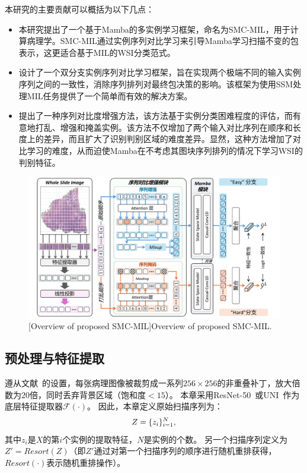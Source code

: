 本研究的主要贡献可以概括为以下几点：
\begin{itemize}
  \item 本研究提出了一个基于Mamba的多实例学习框架，命名为SMC-MIL，用于计算病理学。SMC-MIL通过实例序列对比学习来引导Mamba学习扫描不变的包表示，这更适合基于MIL的WSI分类范式。
  \item 设计了一个双分支实例序列对比学习框架，旨在实现两个极端不同的输入实例序列之间的一致性，消除序列排列对最终包决策的影响。该框架为使用SSM处理MIL任务提供了一个简单而有效的解决方案。
  \item 提出了一种序列对比度增强方法，该方法基于实例分类困难程度的评估，而有意地打乱、增强和掩盖实例。该方法不仅增加了两个输入对比序列在顺序和长度上的差异，而且扩大了识别判别区域的难度差异。显然，这种方法增加了对比学习的难度，从而迫使Mamba在不考虑其图块序列排列的情况下学习WSI的判别特征。 
\end{itemize}

\begin{figure}[h]
  \centering
  \includegraphics[width=1.0\columnwidth]{figures/SMCMIL.pdf}
  [Overview of proposed SMC-MIL]{Overview of proposed SMC-MIL.}
  \label{figure3: SMCMIL}
\end{figure}

\subsection[\hspace{-2pt}预处理与特征提取]{{\heiti{} \hspace{-8pt}预处理与特征提取}}\label{section4: 预处理与特征提取}

遵从文献~\cite{lu2021data}的设置，每张病理图像被裁剪成一系列$256\times256$的非重叠补丁，放大倍数为$20$倍，同时丢弃背景区域（饱和度$< 15$）。
本章采用ResNet-50~\cite{ROYERCARFAGNI2001253}或UNI~\cite{chen2024towards}作为底层特征提取器$\mathcal{F}(\cdot)$。
因此，本章定义原始扫描序列为：
\begin{equation}
  \mathnormal{Z}=\{z_i\}^{\mathnormal{N}}_{i=1},
\end{equation}
其中$z_i$是$X$的第$i$个实例的提取特征，$N$是实例的个数。
另一个扫描序列定义为$Z'=Resort(Z)$（即$Z'$通过对第一个扫描序列的顺序进行随机重排获得，$Resort(\cdot)$表示随机重排操作）。

